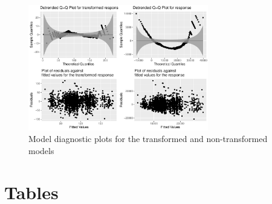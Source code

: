\documentclass[11pt]{article}
\begin{document}
\begin{figure}[H]
	\centering
	\includegraphics[width=0.7\textwidth]{qqplots}
	\caption{Model diagnostic plots for the transformed and non-transformed models}
	\label{fig:qqplots}
\end{figure}

\section{Tables}
\end{document}
